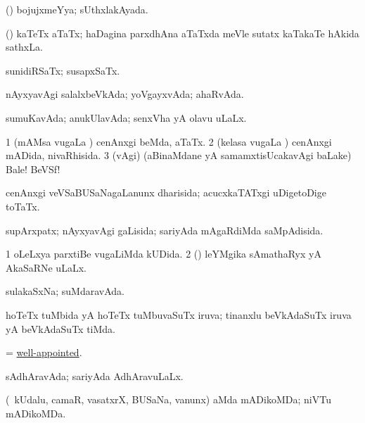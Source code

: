 \bentry
{} 
\gl{\gu}
\expl{}
\bmng
(\AmA) bojujxmeYya; sUthxlakAyada. 
\emng
\eentry

\bentry
{} 
\gl{\nA}
\expl{}
\bmng
(\nw) kaTeTx aTaTx; haDagina parxdhAna aTaTxda meVle sutatx kaTakaTe hAkida sathxLa. 
\emng
\eentry

\bentry
{} 
\gl{\gu}
\expl{}
\bmng
sunidiRSaTx; susapxSaTx. 
\emng
\eentry

\bentry
{} 
\gl{\gu}
\bmng
nAyxyavAgi salalxbeVkAda; yoVgayxvAda; ahaRvAda. 
\emng
\eentry

\bentry
{} 
\gl{\gu}
\expl{}
\bmng
sumuKavAda; anukUlavAda; senxVha yA olavu uLaLx. 
\emng
\eentry

\bentry
{} 
\gl{\gu}
\expl{}
\bmng
\bnum
\num{1} (mAMsa \mo vugaLa \vi) cenAnxgi beMda, aTaTx. 
\num{2} (kelasa \mo vugaLa \vi) cenAnxgi mADida, nivaRhisida. 
\num{3} (\BAavayx vAgi) (aBinaMdane yA samamxtisUcakavAgi baLake) Bale! BeVSf! 
\enum
\emng
\eentry

\bentry
{} 
\gl{\gu}
\expl{}
\bmng
cenAnxgi veVSaBUSaNagaLanunx dharisida; acucxkaTATxgi uDigetoDige toTaTx. 
\emng
\eentry

\bentry
{} 
\gl{\gu}
\expl{}
\bmng
supArxpatx; nAyxyavAgi gaLisida; sariyAda mAgaRdiMda saMpAdisida. 
\emng
\eentry

\bentry
{} 
\gl{\gu}
\expl{}
\bmng
\bnum
\num{1} oLeLxya parxtiBe \mo vugaLiMda kUDida. 
\num{2} (\AmA) leYMgika sAmathaRyx yA AkaSaRNe uLaLx. 
\enum
\emng
\eentry

\bentry
{} 
\gl{\gu}
\expl{}
\bmng
sulakaSxNa; suMdaravAda. 
\emng
\eentry

\bentry
{} 
\gl{\gu}
\expl{}
\bmng
hoTeTx tuMbida yA hoTeTx tuMbuvaSuTx iruva; tinanxlu beVkAdaSuTx iruva yA beVkAdaSuTx tiMda. 
\emng
\eentry

\bentry
{} 
\gl{\gu}
\expl{}
\bmng
= \hyperlink{well-appointed}{well-appointed}. 
\emng
\eentry

\bentry
{} 
\gl{\gu}
\expl{}
\bmng
sAdhAravAda; sariyAda AdhAravuLaLx. 
\emng
\eentry

\bentry
{} 
\gl{\gu}
\expl{}
\bmng
(\kanmu\ kUdalu, camaR, vasatxrX, BUSaNa, \mo vanunx) aMda mADikoMDa; niVTu mADikoMDa. 
\emng
\eentry

